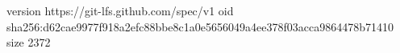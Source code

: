version https://git-lfs.github.com/spec/v1
oid sha256:d62cae9977f918a2efc88bbe8c1a0e5656049a4ee378f03acca9864478b71410
size 2372
